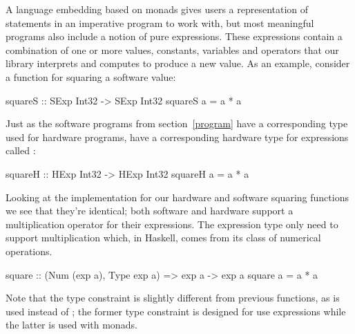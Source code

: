 \documentclass[../main.tex]{subfiles}
\begin{document}
A language embedding based on monads gives users a representation of statements in an imperative program to work with, but most meaningful programs also include a notion of pure expressions. These expressions contain a combination of one or more values, constants, variables and operators that our library interprets and computes to produce a new value. As an example, consider a function for squaring a software value:

\begin{code}
squareS :: SExp Int32 -> SExp Int32
squareS a = a * a
\end{code}


Just as the software programs from section~\ref{program} have a corresponding type used for hardware programs,  have a corresponding hardware type for expressions called :


\begin{stub}
squareH :: HExp Int32 -> HExp Int32
squareH a = a * a
\end{stub}

Looking at the implementation for our hardware and software squaring functions we see that they're identical; both software and hardware support a multiplication operator for their expressions. The expression type only need to support multiplication which, in Haskell, comes from its  class of numerical operations.


\begin{code}
square :: (Num (exp a), Type exp a) => exp a -> exp a
square a = a * a
\end{code}

\noindent Note that the type constraint is slightly different from previous functions, as  is used instead of ; the former type constraint is designed for use expressions while the latter is used with monads.
\end{document}

